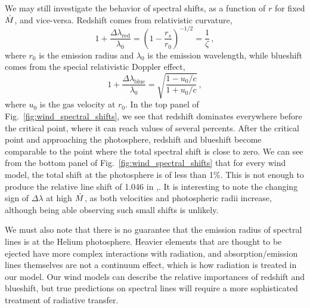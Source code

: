 \documentclass[../main.tex]{subfiles}
\begin{document}
\begingroup
\allowdisplaybreaks
We may still investigate the behavior of spectral shifts, as a function of $r$ for fixed $\dot{M}$, and vice-versa. Redshift comes from relativistic curvature,
\begin{equation}
    1+\frac{\Delta\lambda_\text{red}}{\lambda_0}=\left(1-\frac{r_s}{r_0}\right)^{-1/2}=\frac{1}{\zeta}\,,
\end{equation}
\endgroup
where $r_0$ is the emission radius and $\lambda_0$ is the emission wavelength, while blueshift comes from the special relativistic Doppler effect,
\begin{equation}
    1+\frac{\Delta\lambda_\text{blue}}{\lambda_0}=\sqrt{\frac{1-u_0/c}{1+u_0/c}}\,,
\end{equation}
where $u_0$ is the gas velocity at $r_0$. In the top panel of Fig.~\ref{fig:wind_spectral_shifts}, we see that redshift dominates everywhere before the critical point, where it can reach values of several percents. After the critical point and approaching the photosphere, redshift and blueshift become comparable to the point where the total spectral shift is close to zero. We can see from the bottom panel of Fig.~\ref{fig:wind_spectral_shifts} that for every wind model, the total shift at the photosphere is of less than 1\%. This is not enough to produce the relative line shift of 1.046 in \citet{Strohmayer2019},. It is interesting to note the changing sign of $\Delta\lambda$ at high $\dot{M}$, as both velocities and photospheric radii increase, although being able observing such small shifts is unlikely.

We must also note that there is no guarantee that the emission radius of spectral lines is at the Helium photosphere. Heavier elements that are thought to be ejected have more complex interactions with radiation, and absorption/emission lines themselves are not a continuum effect, which is how radiation is treated in our model. Our wind models can describe the relative importances of redshift and blueshift, but true predictions on spectral lines will require a more sophisticated treatment of radiative transfer.
\end{document}
